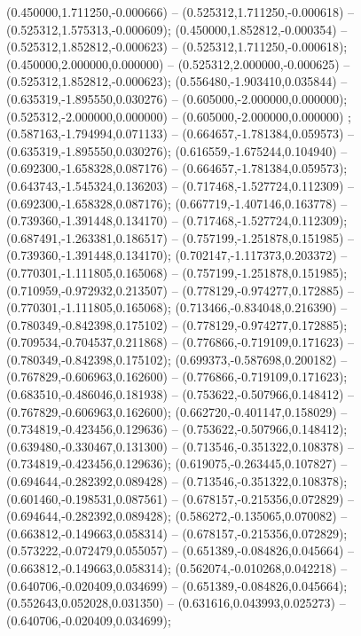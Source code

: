  (0.450000,1.711250,-0.000666) -- (0.525312,1.711250,-0.000618) -- (0.525312,1.575313,-0.000609);
 (0.450000,1.852812,-0.000354) -- (0.525312,1.852812,-0.000623) -- (0.525312,1.711250,-0.000618);
 (0.450000,2.000000,0.000000) -- (0.525312,2.000000,-0.000625) -- (0.525312,1.852812,-0.000623);
 (0.556480,-1.903410,0.035844) -- (0.635319,-1.895550,0.030276) -- (0.605000,-2.000000,0.000000);
 (0.525312,-2.000000,0.000000) -- (0.605000,-2.000000,0.000000) ;
 (0.587163,-1.794994,0.071133) -- (0.664657,-1.781384,0.059573) -- (0.635319,-1.895550,0.030276);
 (0.616559,-1.675244,0.104940) -- (0.692300,-1.658328,0.087176) -- (0.664657,-1.781384,0.059573);
 (0.643743,-1.545324,0.136203) -- (0.717468,-1.527724,0.112309) -- (0.692300,-1.658328,0.087176);
 (0.667719,-1.407146,0.163778) -- (0.739360,-1.391448,0.134170) -- (0.717468,-1.527724,0.112309);
 (0.687491,-1.263381,0.186517) -- (0.757199,-1.251878,0.151985) -- (0.739360,-1.391448,0.134170);
 (0.702147,-1.117373,0.203372) -- (0.770301,-1.111805,0.165068) -- (0.757199,-1.251878,0.151985);
 (0.710959,-0.972932,0.213507) -- (0.778129,-0.974277,0.172885) -- (0.770301,-1.111805,0.165068);
 (0.713466,-0.834048,0.216390) -- (0.780349,-0.842398,0.175102) -- (0.778129,-0.974277,0.172885);
 (0.709534,-0.704537,0.211868) -- (0.776866,-0.719109,0.171623) -- (0.780349,-0.842398,0.175102);
 (0.699373,-0.587698,0.200182) -- (0.767829,-0.606963,0.162600) -- (0.776866,-0.719109,0.171623);
 (0.683510,-0.486046,0.181938) -- (0.753622,-0.507966,0.148412) -- (0.767829,-0.606963,0.162600);
 (0.662720,-0.401147,0.158029) -- (0.734819,-0.423456,0.129636) -- (0.753622,-0.507966,0.148412);
 (0.639480,-0.330467,0.131300) -- (0.713546,-0.351322,0.108378) -- (0.734819,-0.423456,0.129636);
 (0.619075,-0.263445,0.107827) -- (0.694644,-0.282392,0.089428) -- (0.713546,-0.351322,0.108378);
 (0.601460,-0.198531,0.087561) -- (0.678157,-0.215356,0.072829) -- (0.694644,-0.282392,0.089428);
 (0.586272,-0.135065,0.070082) -- (0.663812,-0.149663,0.058314) -- (0.678157,-0.215356,0.072829);
 (0.573222,-0.072479,0.055057) -- (0.651389,-0.084826,0.045664) -- (0.663812,-0.149663,0.058314);
 (0.562074,-0.010268,0.042218) -- (0.640706,-0.020409,0.034699) -- (0.651389,-0.084826,0.045664);
 (0.552643,0.052028,0.031350) -- (0.631616,0.043993,0.025273) -- (0.640706,-0.020409,0.034699);
